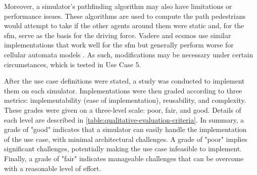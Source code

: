 \documentclass[twoside, 11pt]{article}
\begin{document}
Moreover, a simulator's pathfinding algorithm may also have limitations or performance issues. These algorithms are used to compute the path pedestrians would attempt to take if the other agents around them were static and, for the \acrlong{sfm}, serve as the basis for the driving force. Vadere and \gls{ecsmos} use similar implementations that work well for the \gls{sfm} but generally perform worse for cellular automata models \cite{kleinmeierVadereOpenSourceSimulation2019}. As such, modifications may be necessary under certain circumstances, which is tested in Use Case 5.

After the use case definitions were stated, a study was conducted to implement them on each simulator. Implementations were then graded according to three metrics: implementability (ease of implementation), reusability, and complexity. These grades were given on a three-level scale: poor, fair, and good. Details of each level are described in \autoref{table:qualitative-evaluation-criteria}. In summary, a grade of "good" indicates that a simulator can easily handle the implementation of the use case, with minimal architectural challenges. A grade of "poor" implies significant challenges, potentially making the use case infeasible to implement. Finally, a grade of "fair" indicates manageable challenges that can be overcome with a reasonable level of effort.
\end{document}
